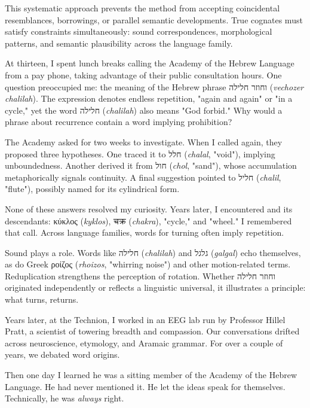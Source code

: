 This systematic approach prevents the method from accepting coincidental resemblances, borrowings, or parallel semantic developments. True cognates must satisfy constraints simultaneously: sound correspondences, morphological patterns, and semantic plausibility across the language family. 

\begin{commentary}
At thirteen, I spent lunch breaks calling the Academy of the Hebrew Language from a pay phone, taking advantage of their public consultation hours. One question preoccupied me: the meaning of the Hebrew phrase \texthebrew{וחוזר חלילה} (\emph{vechozer chalilah}). The expression denotes endless repetition, "again and again" or "in a cycle," yet the word \texthebrew{חלילה} (\emph{chalilah}) also means "God forbid." Why would a phrase about recurrence contain a word implying prohibition?

The Academy asked for two weeks to investigate. When I called again, they proposed three hypotheses. One traced it to \texthebrew{חלל} (\emph{chalal}, "void"), implying unboundedness. Another derived it from \texthebrew{חול} (\emph{chol}, "sand"), whose accumulation metaphorically signals continuity. A final suggestion pointed to \texthebrew{חליל} (\emph{chalil}, "flute"), possibly named for its cylindrical form.

None of these answers resolved my curiosity. Years later, I encountered  and its descendants: \textgreek{κύκλος} (\emph{kyklos}), \textsanskrit{चक्र} (\emph{chakra}), "cycle," and "wheel." I remembered that call. Across language families, words for turning often imply repetition.

Sound plays a role. Words like \texthebrew{חלילה} (\emph{chalilah}) and \texthebrew{גלגל} (\emph{galgal}) echo themselves, as do Greek \textgreek{ροίζος} (\emph{rhoizos}, "whirring noise") and other motion-related terms. Reduplication strengthens the perception of rotation. Whether \texthebrew{וחוזר חלילה} originated independently or reflects a linguistic universal, it illustrates a principle: what turns, returns.

Years later, at the Technion, I worked in an EEG lab run by Professor Hillel Pratt, a scientist of towering breadth and compassion. Our conversations drifted across neuroscience, etymology, and Aramaic grammar. For over a couple of years, we debated word origins.

Then one day I learned he was a sitting member of the Academy of the Hebrew Language. He had never mentioned it. He let the ideas speak for themselves. Technically, he was \textit{always} right.
\end{commentary}

